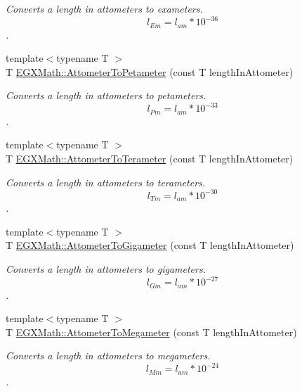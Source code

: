 \begin{DoxyCompactItemize}
\begin{DoxyCompactList}\small\item\em Converts a length in attometers to exameters. \[ l_{Em}=l_{am} * 10^{-36} \]. \end{DoxyCompactList}\item 
{\footnotesize template$<$typename T $>$ }\\T \mbox{\hyperlink{group___e_g_x_math-_conversions-_length_conversions-_attometer-_s_i_ga780e4aa3b174598a72aefa3bdd960447}{E\+G\+X\+Math\+::\+Attometer\+To\+Petameter}} (const T length\+In\+Attometer)
\begin{DoxyCompactList}\small\item\em Converts a length in attometers to petameters. \[ l_{Pm}=l_{am} * 10^{-33} \]. \end{DoxyCompactList}\item 
{\footnotesize template$<$typename T $>$ }\\T \mbox{\hyperlink{group___e_g_x_math-_conversions-_length_conversions-_attometer-_s_i_gac4d61e3aceb437ff7d52729ed4860f61}{E\+G\+X\+Math\+::\+Attometer\+To\+Terameter}} (const T length\+In\+Attometer)
\begin{DoxyCompactList}\small\item\em Converts a length in attometers to terameters. \[ l_{Tm}=l_{am} * 10^{-30} \]. \end{DoxyCompactList}\item 
{\footnotesize template$<$typename T $>$ }\\T \mbox{\hyperlink{group___e_g_x_math-_conversions-_length_conversions-_attometer-_s_i_ga6d8498c20f3df80b922e6cb076c35fb8}{E\+G\+X\+Math\+::\+Attometer\+To\+Gigameter}} (const T length\+In\+Attometer)
\begin{DoxyCompactList}\small\item\em Converts a length in attometers to gigameters. \[ l_{Gm}=l_{am} * 10^{-27} \]. \end{DoxyCompactList}\item 
{\footnotesize template$<$typename T $>$ }\\T \mbox{\hyperlink{group___e_g_x_math-_conversions-_length_conversions-_attometer-_s_i_gad381bcfa61a8521acea1c79f84750a5d}{E\+G\+X\+Math\+::\+Attometer\+To\+Megameter}} (const T length\+In\+Attometer)
\begin{DoxyCompactList}\small\item\em Converts a length in attometers to megameters. \[ l_{Mm}=l_{am} * 10^{-24} \]. \end{DoxyCompactList}\item 

\end{DoxyCompactItemize}
